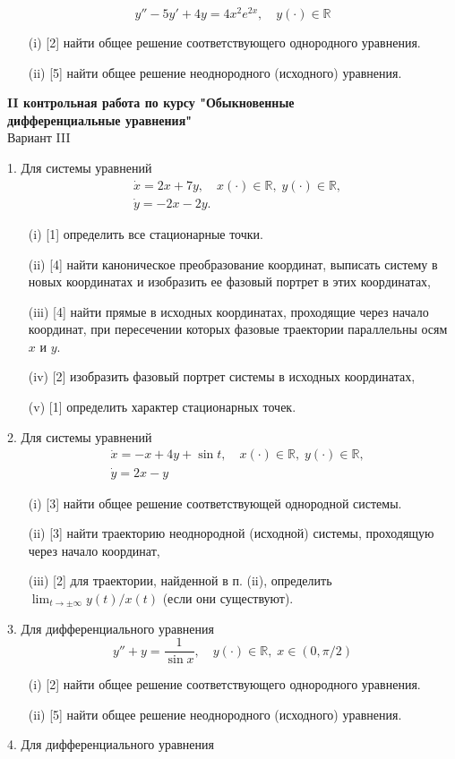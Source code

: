 \documentclass[a4paper, 12pt]{article}
\begin{document}
$$
y''-5y'+4y=4x^2 e^{2x}, \quad y(\cdot) \in \mathbb{R}
$$
\begin{itemize}
\item [(i)][2]  найти общее решение соответствующего однородного уравнения.
\item [(ii)][5] найти общее решение неоднородного (исходного) уравнения.

\end{itemize}






\newpage
\begin{center}
\textbf{II контрольная работа по курсу "Обыкновенные \\
дифференциальные уравнения"
}\\
{Вариант III}
\end{center}
1. Для системы уравнений
$$
\begin{aligned}
&\dot{x}=2 x+7 y, \quad x(\cdot) \in \mathbb{R}, \; y(\cdot) \in \mathbb{R}, \\
&\dot{y}= -2x- 2y .
\end{aligned}
$$
\begin{itemize}
\item [(i)][1] определить все стационарные точки.
\item [(ii)][4] найти каноническое преобразование координат, выписать систему в новых координатах и изобразить ее фазовый портрет в этих координатах,
\item [(iii)][4] найти прямые в исходных координатах, проходящие через начало координат, при пересечении которых фазовые траектории параллельны осям $x$ и $y$.
\item [(iv)][2]  изобразить фазовый портрет системы в исходных координатах,
\item [(v)][1]  определить характер стационарных точек.
\end{itemize}
2. Для системы уравнений
$$
\begin{aligned}
&\dot{x}=-x+4y+\sin t , \quad x(\cdot) \in \mathbb{R},\; y(\cdot) \in \mathbb{R}, \\
&\dot{y}=2x-y
\end{aligned}
$$
\begin{itemize}
\item [(i)][3] найти общее решение соответствующей однородной системы.
\item [(ii)][3] найти траекторию неоднородной (исходной) системы, проходящую через начало координат,
\item [(iii)][2] для траектории, найденной в п. (ii), определить $\lim _{t \rightarrow \pm \infty} y(t) / x(t)$ (если они существуют).
\end{itemize}
3. Для дифференциального уравнения
$$
y''+y=\frac {1}{\sin{x}}, \quad y(\cdot) \in \mathbb{R},\; x \in(0, \pi / 2)
$$
\begin{itemize}
\item [(i)][2]  найти общее решение соответствующего однородного уравнения.
\item [(ii)][5]  найти общее решение неоднородного (исходного) уравнения.
\end{itemize}
4. Для дифференциального уравнения
\end{document}
